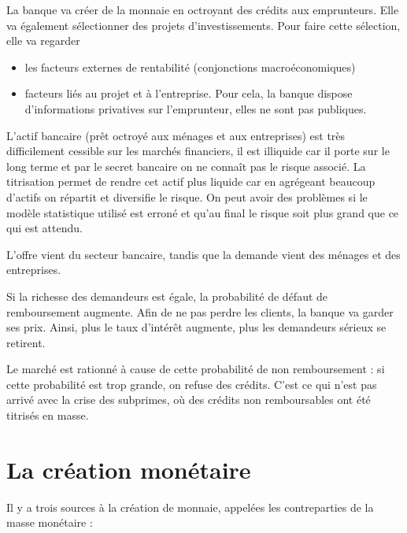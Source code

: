 	La banque va créer de la monnaie en octroyant des crédits aux emprunteurs. Elle va également sélectionner des projets d'investissements. Pour faire cette sélection, elle va regarder
	
	\begin{itemize}
		\item les facteurs externes de rentabilité (conjonctions macroéconomiques)
		\item facteurs liés au projet et à l'entreprise. Pour cela, la banque dispose d'informations privatives sur l'emprunteur, elles ne sont pas publiques.
	\end{itemize}
	
	L'actif bancaire (prêt octroyé aux ménages et aux entreprises) est très difficilement cessible sur les marchés financiers, il est illiquide car il porte sur le long terme et par le secret bancaire on ne connaît pas le risque associé. La titrisation permet de rendre cet actif plus liquide car en agrégeant beaucoup d'actifs on répartit et diversifie le risque. On peut avoir des problèmes si le modèle statistique utilisé est erroné et qu'au final le risque soit plus grand que ce qui est attendu.
	
	
	L'offre vient du secteur bancaire, tandis que la demande vient des ménages et des entreprises.
	
	Si la richesse des demandeurs est égale, la probabilité de défaut de remboursement augmente. Afin de ne pas perdre les clients, la banque va garder ses prix. Ainsi, plus le taux d'intérêt augmente, plus les demandeurs sérieux se retirent.
	
	Le marché est rationné à cause de cette probabilité de non remboursement : si cette probabilité est trop grande, on refuse des crédits. C'est ce qui n'est pas arrivé avec la crise des subprimes, où des crédits non remboursables ont été titrisés en masse.
	
\section{La création monétaire}

Il y a trois sources à la création de monnaie, appelées les contreparties de la masse monétaire :

